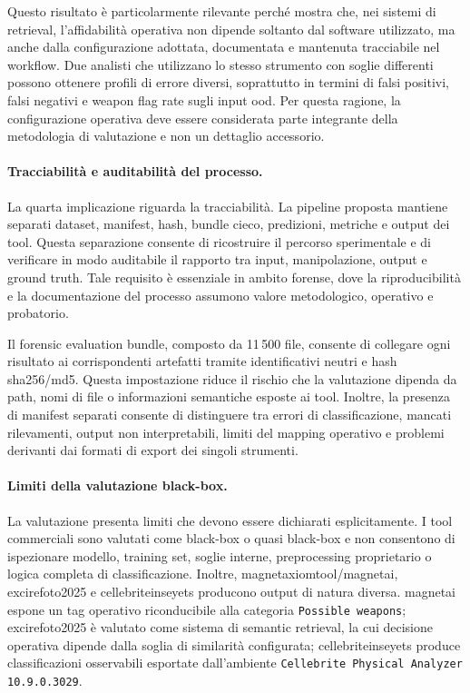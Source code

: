 Questo risultato è particolarmente rilevante perché mostra che, nei sistemi di
retrieval, l'affidabilità operativa non dipende soltanto dal software utilizzato,
ma anche dalla configurazione adottata, documentata e mantenuta tracciabile nel
workflow. Due analisti che utilizzano lo stesso strumento con soglie differenti
possono ottenere profili di errore diversi, soprattutto in termini di falsi
positivi, falsi negativi e weapon flag rate sugli input \gls{ood}. Per questa
ragione, la configurazione operativa deve essere considerata parte integrante
della metodologia di valutazione e non un dettaglio accessorio.

\paragraph{Tracciabilità e auditabilità del processo.}

La quarta implicazione riguarda la tracciabilità. La pipeline proposta mantiene
separati dataset, manifest, hash, bundle cieco, predizioni, metriche e output
dei tool. Questa separazione consente di ricostruire il percorso sperimentale e
di verificare in modo auditabile il rapporto tra input, manipolazione, output e
ground truth. Tale requisito è essenziale in ambito forense, dove la
riproducibilità e la documentazione del processo assumono valore metodologico,
operativo e probatorio.

Il forensic evaluation bundle, composto da 11\,500 file, consente di collegare
ogni risultato ai corrispondenti artefatti tramite identificativi neutri e hash
\gls{sha256}/\gls{md5}. Questa impostazione riduce il rischio che la valutazione
dipenda da path, nomi di file o informazioni semantiche esposte ai tool. Inoltre,
la presenza di manifest separati consente di distinguere tra errori di
classificazione, mancati rilevamenti, output non interpretabili, limiti del
mapping operativo e problemi derivanti dai formati di export dei singoli
strumenti.

\paragraph{Limiti della valutazione black-box.}

La valutazione presenta limiti che devono essere dichiarati esplicitamente. I
tool commerciali sono valutati come black-box o quasi black-box e non consentono
di ispezionare modello, training set, soglie interne, preprocessing proprietario
o logica completa di classificazione. Inoltre,
\gls{magnetaxiomtool}/\gls{magnetai}, \gls{excirefoto2025} e
\gls{cellebriteinseyets} producono output di natura diversa. \gls{magnetai}
espone un tag operativo riconducibile alla categoria \texttt{Possible weapons};
\gls{excirefoto2025} è valutato come sistema di semantic retrieval, la cui
decisione operativa dipende dalla soglia di similarità configurata;
\gls{cellebriteinseyets} produce classificazioni osservabili esportate
dall'ambiente \texttt{Cellebrite Physical Analyzer 10.9.0.3029}.

